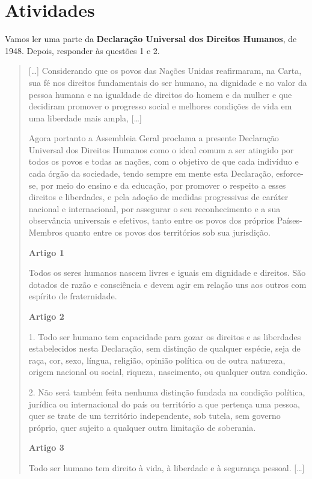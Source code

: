 \section{Atividades}

Vamos ler uma parte da \textbf{Declaração Universal dos Direitos Humanos}, de 1948. Depois, responder às questões 1 e 2.

\begin{quote}
{[}\ldots{}{]}
Considerando que os povos das Nações Unidas reafirmaram, na Carta, sua
fé nos direitos fundamentais do ser humano, na dignidade e no valor da
pessoa humana e na igualdade de direitos do homem e da mulher e que
decidiram promover o progresso social e melhores condições de vida em
uma liberdade mais ampla, {[}\ldots{}{]}

Agora portanto a Assembleia Geral proclama a presente Declaração
Universal dos Direitos Humanos como o ideal comum a ser atingido por
todos os povos e todas as nações, com o objetivo de que cada indivíduo e
cada órgão da sociedade, tendo sempre em mente esta Declaração,
esforce-se, por meio do ensino e da educação, por promover o respeito a
esses direitos e liberdades, e pela adoção de medidas progressivas de
caráter nacional e internacional, por assegurar o seu reconhecimento e a
sua observância universais e efetivos, tanto entre os povos dos próprios
Países-Membros quanto entre os povos dos territórios sob sua jurisdição.

\textbf{Artigo 1}

Todos os seres humanos nascem livres e iguais em dignidade e direitos.
São dotados de razão e consciência e devem agir em relação uns aos
outros com espírito de fraternidade.

\textbf{Artigo 2}

1. Todo ser humano tem capacidade para gozar os direitos e as liberdades
estabelecidos nesta Declaração, sem distinção de qualquer espécie, seja
de raça, cor, sexo, língua, religião, opinião política ou de outra
natureza, origem nacional ou social, riqueza, nascimento, ou qualquer
outra condição.

2. Não será também feita nenhuma distinção fundada na condição política,
jurídica ou internacional do país ou território a que pertença uma
pessoa, quer se trate de um território independente, sob tutela, sem
governo próprio, quer sujeito a qualquer outra limitação de soberania.

\textbf{Artigo 3}

Todo ser humano tem direito à vida, à liberdade e à segurança pessoal. {[}\ldots{}{]}

\end{quote}

